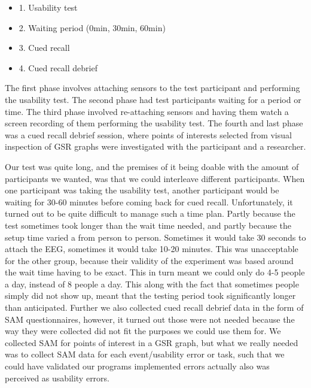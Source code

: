 \begin{itemize}
\item 1. Usability test
\item 2. Waiting period (0min, 30min, 60min)
\item 3. Cued recall
\item 4. Cued recall debrief
\end{itemize}

The first phase involves attaching sensors to the test participant and performing the usability test. The second phase
had test participants waiting for a period or time. 
The third phase involved re-attaching sensors and having them watch a screen recording of them performing the usability test.
The fourth and last phase was a cued recall debrief session, where points of interests selected from visual inspection of GSR graphs were investigated with the participant and a researcher.

Our test was quite long, and the premises of it being doable with the amount of participants we wanted, was that we could interleave different participants. 
When one participant was taking the usability test, another participant would be waiting for 30-60 minutes before coming back for cued recall. 
Unfortunately, it turned out to be quite difficult to manage such a time plan. Partly because the test sometimes took
longer than the wait time needed, and partly because the setup time varied a from person to person. Sometimes it would
take 30 seconds to attach the EEG, sometimes it would take 10-20 minutes. This was unacceptable for the other group,
because their validity of the experiment was based around the wait time having to be exact.
This in turn meant we could only do 4-5 people a day, instead of 8 people a day. 
This along with the fact that sometimes people simply did not show up, meant that the testing period took significantly longer than anticipated. 
Further we also collected cued recall debrief data in the form of SAM questionnaires, however, it turned out those were not needed because the way they were collected did not fit the purposes we could use them for. We collected SAM for points of interest in a GSR graph, but what we really needed was to collect SAM data for each event/usability error or task, such that we could have validated our programs implemented errors actually also was perceived as usability errors. 

